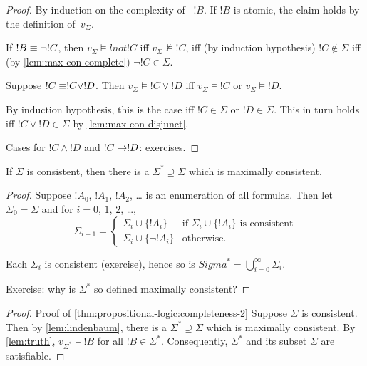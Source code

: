 \documentclass[propositional-logic]{subfiles}
\begin{document}
\begin{proof}
By induction on the complexity of ~$!B$.  If $!B$ is atomic, the claim
holds by the definition of~$v_\Sigma$.

If $!B \equiv \lnot !C$, then $v_\Sigma \models lnot !C$ iff $v_\Sigma
\not\models !C$, iff (by induction hypothesis) $!C \notin \Sigma$ iff
(by \ref{lem:max-con-complete}) $\lnot !C \in \Sigma$.

Suppose $!C \equiv !C \lor !D$.  Then $v_\Sigma \models !C \lor !D$
iff $v_\Sigma \models !C$ or $v_\Sigma \models !D$.

By induction hypothesis, this is the case iff $!C \in \Sigma$ or $!D
\in \Sigma$.  This in turn holds iff $!C \lor !D \in \Sigma$ by
\ref{lem:max-con-disjunct}.

Cases for $!C \land !D$ and $!C \to !D$: exercises.
\end{proof}

\begin{lem}\label{lem:lindenbaum}
If $\Sigma$ is consistent, then there is a $\Sigma^* \supseteq \Sigma$
which is maximally consistent.
\end{lem}

\begin{proof}
Suppose $!A_0$, $!A_1$, $!A_2$, \dots{} is an enumeration of all
formulas.  Then let $\Sigma_0 = \Sigma$ and for $i = 0$, $1$, $2$,
\dots,
\[
\Sigma_{i+1} = 
\begin{cases}
\Sigma_i \cup \{!A_i\} & \text{if $\Sigma_i \cup \{!A_i\}$ is
  consistent}\\ \Sigma_i \cup \{\lnot !A_i\} & \text{otherwise.}
\end{cases}
\] 

Each $\Sigma_i$ is consistent (exercise), hence so is $Sigma^* =
\bigcup_{i=0}^\infty \Sigma_i$.

Exercise: why is $\Sigma^*$ so defined maximally consistent?
\end{proof}

\begin{proof}{Proof of \ref{thm:propositional-logic:completeness-2}} 
Suppose $\Sigma$ is consistent.  Then by \ref{lem:lindenbaum}, there
is a $\Sigma^* \supseteq \Sigma$ which is maximally consistent.  By
\ref{lem:truth}, $v_{\Sigma^*} \models !B$ for all $!B \in \Sigma^*$.
Consequently, $\Sigma^*$ and its subset $\Sigma$ are satisfiable.
\end{proof}
\end{document}
